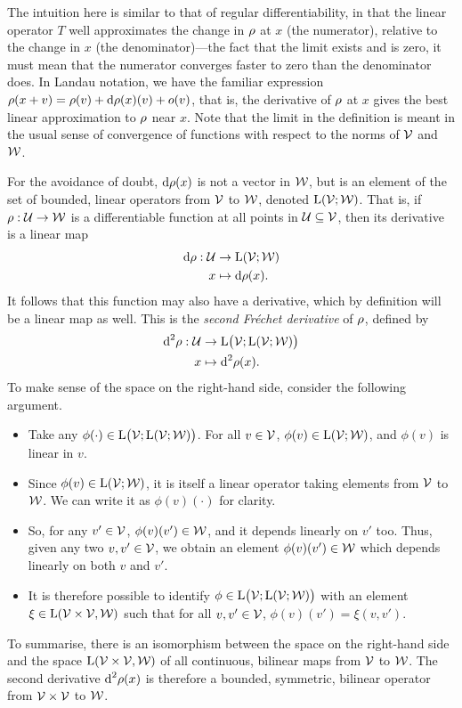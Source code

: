 The intuition here is similar to that of regular differentiability, in that the linear operator $T$ well approximates the change in $\rho$ at $x$ (the numerator), relative to the change in $x$ (the denominator)---the fact that the limit exists and is zero, it must mean that the numerator converges faster to zero than the denominator does.
In Landau notation, we have the familiar expression $\rho(x+v) = \rho(v) + \text{d} \rho(x)(v) + o(v)$, that is, the derivative of $\rho$ at $x$ gives the best linear approximation to $\rho$ near $x$.
Note that the limit in the definition is meant in the usual sense of convergence of functions with respect to the norms of ${\mathcal V}$ and ${\mathcal W}$.

For the avoidance of doubt, $\text{d} \rho(x)$ is not a vector in ${\mathcal W}$, but is an element of the set of bounded, linear operators from ${\mathcal V}$ to ${\mathcal W}$, denoted $\text{L}({\mathcal V};{\mathcal W})$.
That is, if $\rho :{\mathcal U}\to{\mathcal W}$ is a differentiable function at all points in ${\mathcal U}\subseteq{\mathcal V}$, then its derivative is a linear map
\begin{align*}
  \text{d} \rho : {\mathcal U} &\to \text{L}({\mathcal V};{\mathcal W}) \\
  x &\mapsto \text{d} \rho(x).
\end{align*}
It follows that this function may also have a derivative, which by definition will be a linear map as well.
This is the \emph{second Fréchet derivative} of $\rho$, defined by
\begin{align*}
  \text{d}^2 \rho : {\mathcal U} &\to \text{L}\big({\mathcal V};\text{L}({\mathcal V};{\mathcal W})\big) \\
  x &\mapsto \text{d}^2\rho(x).
\end{align*}
To make sense of the space on the right-hand side, consider the following argument.
\begin{itemize}
  \item Take any $\phi(\cdot) \in \text{L}\big({\mathcal V};\text{L}({\mathcal V};{\mathcal W})\big)$. For all $v\in{\mathcal V}$, $\phi(v)\in\text{L}({\mathcal V};{\mathcal W})$, and $\phi(v)$ is linear in $v$.
  \item Since $\phi(v)\in\text{L}({\mathcal V};{\mathcal W})$, it is itself a linear operator taking elements from ${\mathcal V}$ to ${\mathcal W}$. We can write it as $\phi(v)(\cdot)$ for clarity.
  \item So, for any $v'\in{\mathcal V}$, $\phi(v)(v')\in{\mathcal W}$, and it depends linearly on $v'$ too. Thus, given any two $v,v'\in{\mathcal V}$, we obtain an element $\phi(v)(v')\in{\mathcal W}$ which depends linearly on both $v$ and $v'$.
  \item It is therefore possible to identify $\phi \in \text{L}\big({\mathcal V};\text{L}({\mathcal V};{\mathcal W})\big)$ with an element $\xi \in \text{L}({\mathcal V} \times {\mathcal V}, {\mathcal W})$ such that for all $v,v'\in{\mathcal V}$, $\phi(v)(v') = \xi(v,v')$.
\end{itemize}
To summarise, there is an isomorphism between the space on the right-hand side and the space $\text{L}({\mathcal V} \times {\mathcal V}, {\mathcal W})$ of all continuous, bilinear maps from ${\mathcal V}$ to ${\mathcal W}$.
The second derivative $\text{d}^2 \rho(x)$ is therefore a bounded, symmetric, bilinear operator from ${\mathcal V}\times{\mathcal V}$ to ${\mathcal W}$.


